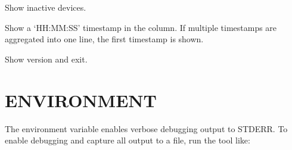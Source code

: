 \documentclass[letterpaper,10pt,english]{sphinxmanual}
\begin{document}
\begin{fulllineitems}
\label{\detokenize{mariadb-iostat:cmdoption-mariadb-iostat-show-inactive}}
\sphinxAtStartPar
Show inactive devices.

\end{fulllineitems}


\begin{fulllineitems}
\label{\detokenize{mariadb-iostat:cmdoption-mariadb-iostat-show-timestamps}}
\sphinxAtStartPar
Show a ‘HH:MM:SS’ timestamp in the  column.  If multiple timestamps are
aggregated into one line, the first timestamp is shown.

\end{fulllineitems}


\begin{fulllineitems}
\label{\detokenize{mariadb-iostat:cmdoption-mariadb-iostat-version}}
\sphinxAtStartPar
Show version and exit.

\end{fulllineitems}



\section{ENVIRONMENT}
\label{\detokenize{mariadb-iostat:environment}}
\sphinxAtStartPar
The environment variable  enables verbose debugging output to STDERR.
To enable debugging and capture all output to a file, run the tool like:
\end{document}
